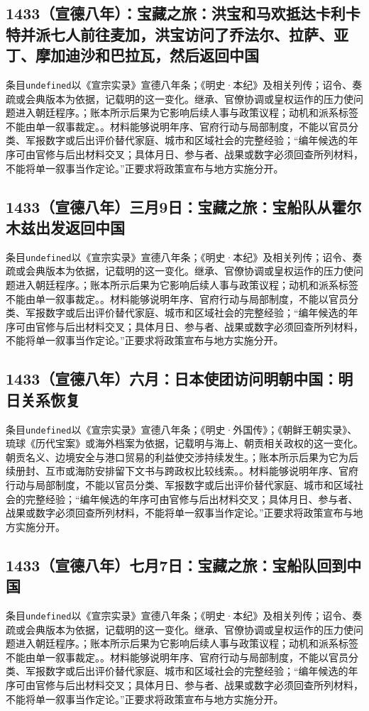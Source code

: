 \subsection{1433（宣德八年）：宝藏之旅：洪宝和马欢抵达卡利卡特并派七人前往麦加，洪宝访问了乔法尔、拉萨、亚丁、摩加迪沙和巴拉瓦，然后返回中国}
条目\texttt{undefined}以《宣宗实录》宣德八年条；《明史·本纪》及相关列传；诏令、奏疏或会典版本为依据，记载明的这一变化。继承、官僚协调或皇权运作的压力使问题进入朝廷程序。；账本所示后果为它影响后续人事与政策议程；动机和派系标签不能由单一叙事裁定。。材料能够说明年序、官府行动与局部制度，不能以官员分类、军报数字或后出评价替代家庭、城市和区域社会的完整经验；“编年候选的年序可由官修与后出材料交叉；具体月日、参与者、战果或数字必须回查所列材料，不能将单一叙事当作定论。”正要求将政策宣布与地方实施分开。

\subsection{1433（宣德八年）三月9日：宝藏之旅：宝船队从霍尔木兹出发返回中国}
条目\texttt{undefined}以《宣宗实录》宣德八年条；《明史·本纪》及相关列传；诏令、奏疏或会典版本为依据，记载明的这一变化。继承、官僚协调或皇权运作的压力使问题进入朝廷程序。；账本所示后果为它影响后续人事与政策议程；动机和派系标签不能由单一叙事裁定。。材料能够说明年序、官府行动与局部制度，不能以官员分类、军报数字或后出评价替代家庭、城市和区域社会的完整经验；“编年候选的年序可由官修与后出材料交叉；具体月日、参与者、战果或数字必须回查所列材料，不能将单一叙事当作定论。”正要求将政策宣布与地方实施分开。

\subsection{1433（宣德八年）六月：日本使团访问明朝中国：明日关系恢复}
条目\texttt{undefined}以《宣宗实录》宣德八年条；《明史·外国传》；《朝鲜王朝实录》、琉球《历代宝案》或海外档案为依据，记载明与海上、朝贡相关政权的这一变化。朝贡名义、边境安全与港口贸易的利益使交涉持续发生。；账本所示后果为它为后续册封、互市或海防安排留下文书与跨政权比较线索。。材料能够说明年序、官府行动与局部制度，不能以官员分类、军报数字或后出评价替代家庭、城市和区域社会的完整经验；“编年候选的年序可由官修与后出材料交叉；具体月日、参与者、战果或数字必须回查所列材料，不能将单一叙事当作定论。”正要求将政策宣布与地方实施分开。

\subsection{1433（宣德八年）七月7日：宝藏之旅：宝船队回到中国}
条目\texttt{undefined}以《宣宗实录》宣德八年条；《明史·本纪》及相关列传；诏令、奏疏或会典版本为依据，记载明的这一变化。继承、官僚协调或皇权运作的压力使问题进入朝廷程序。；账本所示后果为它影响后续人事与政策议程；动机和派系标签不能由单一叙事裁定。。材料能够说明年序、官府行动与局部制度，不能以官员分类、军报数字或后出评价替代家庭、城市和区域社会的完整经验；“编年候选的年序可由官修与后出材料交叉；具体月日、参与者、战果或数字必须回查所列材料，不能将单一叙事当作定论。”正要求将政策宣布与地方实施分开。

